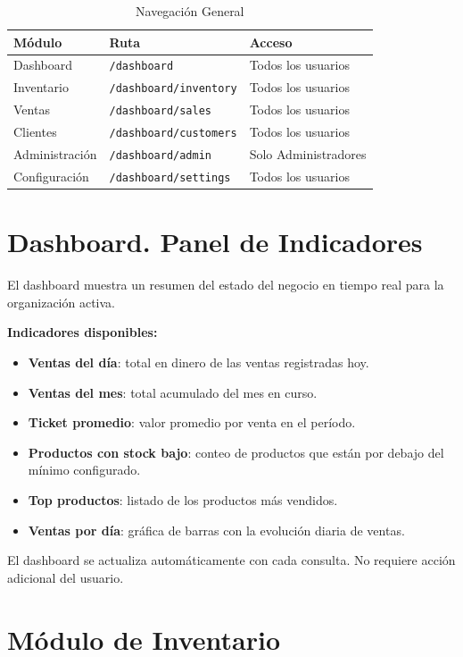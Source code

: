 \begin{longtable}[]{@{}lll@{}}
\caption[Navegación General]{Navegación General}\tabularnewline
\toprule\noalign{}
Módulo & Ruta & Acceso \\
\midrule\noalign{}
\endhead
\bottomrule\noalign{}
\endlastfoot
Dashboard & \texttt{/dashboard} & Todos los usuarios \\
Inventario & \texttt{/dashboard/inventory} & Todos los usuarios \\
Ventas & \texttt{/dashboard/sales} & Todos los usuarios \\
Clientes & \texttt{/dashboard/customers} & Todos los usuarios \\
Administración & \texttt{/dashboard/admin} & Solo Administradores \\
Configuración & \texttt{/dashboard/settings} & Todos los usuarios \\
\end{longtable}

\section{Dashboard. Panel de Indicadores}\label{dashboard.-panel-de-indicadores}

El dashboard muestra un resumen del estado del negocio en tiempo real para la organización activa.

\textbf{Indicadores disponibles:}

\begin{itemize}
\tightlist
\item
  \textbf{Ventas del día}: total en dinero de las ventas registradas hoy.
\item
  \textbf{Ventas del mes}: total acumulado del mes en curso.
\item
  \textbf{Ticket promedio}: valor promedio por venta en el período.
\item
  \textbf{Productos con stock bajo}: conteo de productos que están por debajo del mínimo configurado.
\item
  \textbf{Top productos}: listado de los productos más vendidos.
\item
  \textbf{Ventas por día}: gráfica de barras con la evolución diaria de ventas.
\end{itemize}

El dashboard se actualiza automáticamente con cada consulta. No requiere acción adicional del usuario.

\section{Módulo de Inventario}\label{muxf3dulo-de-inventario}

